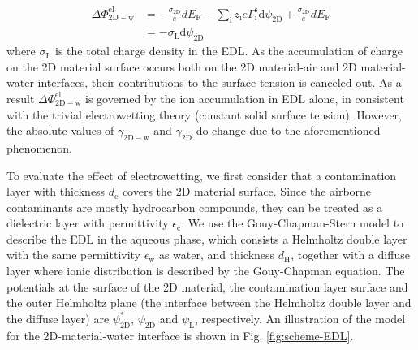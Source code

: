 \documentclass[aps,prl,reprint,groupedaddress,amsmath,amssymb, showpacs]{revtex4-1}
\begin{document}
\begin{equation}
\label{eqn:Delta-Phi-final}
\begin{aligned}
\Delta \Phi_{\mathrm{2D-w}}^{\mathrm{el}} &= -\frac{\sigma_{\mathrm{2D}}}{e}dE_{\mathrm{F}} 
                                             -\sum_{\mathrm{i}} z_{\mathrm{i}}e\Gamma_{\mathrm{i}}^{\mathrm{s}} \mathrm{d}\psi_{\mathrm{2D}}
                                             +\frac{\sigma_{\mathrm{2D}}}{e}dE_{\mathrm{F}} \\
                                          &= -\sigma_{\mathrm{L}} \mathrm{d}\psi_{\mathrm{2D}}
\end{aligned}
\end{equation}
where \(\sigma_{\mathrm{L}}\) is the total charge density in the EDL. As
the accumulation of charge on the 2D material surface occurs both on
the 2D material-air and 2D material-water interfaces, their
contributions to the surface tension is canceled out. As a result
\(\Delta \Phi_{\mathrm{2D-w}}^{\mathrm{el}}\) is governed by the ion
accumulation in EDL alone, in consistent with the trivial
electrowetting theory (constant solid surface tension). However, the
absolute values of \(\gamma_{\mathrm{2D-w}}\) and \(\gamma_{\mathrm{2D}}\)
do change due to the aforementioned phenomenon.

To evaluate the effect of electrowetting, we first
consider that a contamination layer with thickness \(d_{\mathrm{c}}\)
covers the 2D material surface. Since the airborne contaminants are
mostly hydrocarbon compounds, they can be treated as a dielectric
layer with permittivity \(\epsilon_{\mathrm{c}}\). We use the
Gouy-Chapman-Stern model to describe the EDL in the aqueous phase,
which consists a Helmholtz double layer with the same permittivity
\(\epsilon_{\mathrm{w}}\) as water, and thickness \(d_{\mathrm{H}}\),
together with a diffuse layer where ionic distribution is described by
the Gouy-Chapman equation.  The potentials at the surface of the 2D
material, the contamination layer surface and the outer Helmholtz
plane (the interface between the Helmholtz double layer and the
diffuse layer) are \(\psi_{\mathrm{2D}}^{*}\), \(\psi_{\mathrm{2D}}\) and
\(\psi_{\mathrm{L}}\), respectively. An illustration of the model for the
2D-material-water interface is shown in Fig. \ref{fig:scheme-EDL}.
\end{document}

